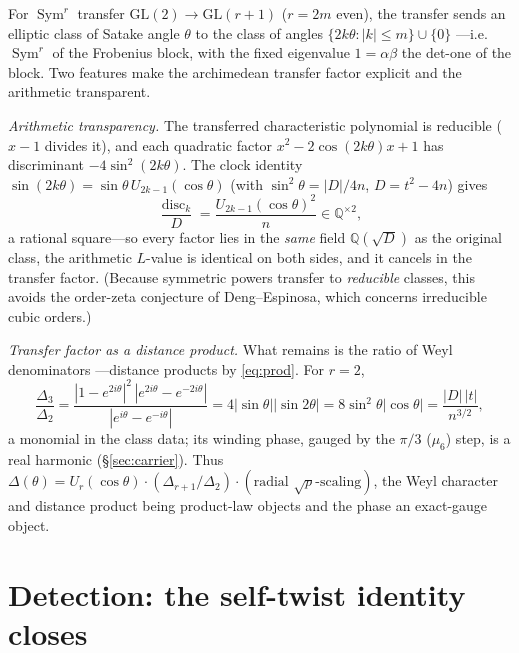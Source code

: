 \documentclass[11pt]{article}
\theoremstyle{definition}
\newcommand{\Sym}{\operatorname{Sym}}
\begin{document}
For $\Sym^r$ transfer $\mathrm{GL}(2)\to\mathrm{GL}(r+1)$ ($r=2m$ even), the transfer sends an
elliptic class of Satake angle $\theta$ to the class of angles $\{2k\theta:|k|\le m\}\cup\{0\}$
---i.e. $\Sym^r$ of the Frobenius block, with the fixed eigenvalue $1=\alpha\beta$ the det-one of
the block. Two features make the archimedean transfer factor explicit and the arithmetic transparent.

\emph{Arithmetic transparency.} The transferred characteristic polynomial is reducible ($x-1$
divides it), and each quadratic factor $x^2-2\cos(2k\theta)x+1$ has discriminant $-4\sin^2(2k\theta)$.
The clock identity $\sin(2k\theta)=\sin\theta\,U_{2k-1}(\cos\theta)$ (with $\sin^2\theta=|D|/4n$,
$D=t^2-4n$) gives
\[
  \frac{\operatorname{disc}_k}{D}=\frac{U_{2k-1}(\cos\theta)^2}{n}\in\mathbb Q^{\times2},
\]
a rational square---so every factor lies in the \emph{same} field $\mathbb Q(\sqrt D)$ as the
original class, the arithmetic $L$-value is identical on both sides, and it cancels in the transfer
factor. (Because symmetric powers transfer to \emph{reducible} classes, this avoids the order-zeta
conjecture of Deng--Espinosa, which concerns irreducible cubic orders.)

\emph{Transfer factor as a distance product.} What remains is the ratio of Weyl denominators
---distance products by \eqref{eq:prod}. For $r=2$,
\[
  \frac{\Delta_3}{\Delta_2}
  =\frac{|1-e^{2i\theta}|^2\,|e^{2i\theta}-e^{-2i\theta}|}{|e^{i\theta}-e^{-i\theta}|}
  =4|\sin\theta||\sin2\theta|=8\sin^2\theta|\cos\theta|=\frac{|D|\,|t|}{n^{3/2}},
\]
a monomial in the class data; its winding phase, gauged by the $\pi/3$ ($\mu_6$) step, is a real
harmonic (\S\ref{sec:carrier}). Thus $\Delta(\theta)=U_r(\cos\theta)\cdot(\Delta_{r+1}/\Delta_2)
\cdot(\text{radial }\sqrt p\text{-scaling})$, the Weyl character and distance product being product-law
objects and the phase an exact-gauge object.

\section{Detection: the self-twist identity closes}\label{sec:detect}
\end{document}
